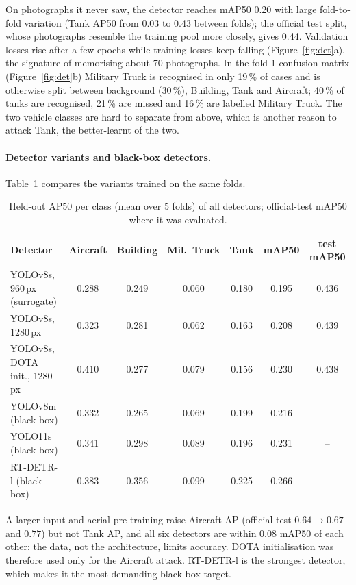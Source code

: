 \documentclass[11pt,a4paper]{article}
\begin{document}
On photographs it never saw, the detector reaches mAP50 0.20 with large fold-to-fold variation (Tank AP50 from 0.03 to 0.43 between folds); the official test split, whose photographs resemble the training pool more closely, gives 0.44. Validation losses rise after a few epochs while training losses keep falling (Figure~\ref{fig:det}a), the signature of memorising about 70 photographs. In the fold-1 confusion matrix (Figure~\ref{fig:det}b) Military Truck is recognised in only 19\,\% of cases and is otherwise split between background (30\,\%), Building, Tank and Aircraft; 40\,\% of tanks are recognised, 21\,\% are missed and 16\,\% are labelled Military Truck. The two vehicle classes are hard to separate from above, which is another reason to attack Tank, the better-learnt of the two.

\paragraph{Detector variants and black-box detectors.} Table~\ref{tab:detvar} compares the variants trained on the same folds.

\begin{table}[htbp]
\centering\small
\caption{Held-out AP50 per class (mean over 5 folds) of all detectors; official-test mAP50 where it was evaluated.}
\label{tab:detvar}
\setlength{\tabcolsep}{4pt}
\begin{tabular}{@{}lcccccc@{}}
\toprule
Detector & Aircraft & Building & Mil.\ Truck & Tank & mAP50 & test mAP50 \\
\midrule
YOLOv8s, 960\,px (surrogate) & 0.288 & 0.249 & 0.060 & 0.180 & 0.195 & 0.436 \\
YOLOv8s, 1280\,px & 0.323 & 0.281 & 0.062 & 0.163 & 0.208 & 0.439 \\
YOLOv8s, DOTA init., 1280\,px & 0.410 & 0.277 & 0.079 & 0.156 & 0.230 & 0.438 \\
\midrule
YOLOv8m (black-box) & 0.332 & 0.265 & 0.069 & 0.199 & 0.216 & -- \\
YOLO11s (black-box) & 0.341 & 0.298 & 0.089 & 0.196 & 0.231 & -- \\
RT-DETR-l (black-box) & 0.383 & 0.356 & 0.099 & 0.225 & 0.266 & -- \\
\bottomrule
\end{tabular}
\end{table}

A larger input and aerial pre-training raise Aircraft AP (official test $0.64\to0.67$ and $0.77$) but not Tank AP, and all six detectors are within 0.08 mAP50 of each other: the data, not the architecture, limits accuracy. DOTA initialisation was therefore used only for the Aircraft attack. RT-DETR-l is the strongest detector, which makes it the most demanding black-box target.
\end{document}

